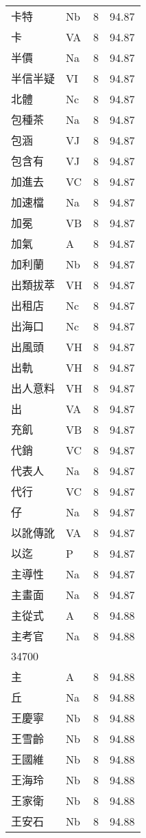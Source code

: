\documentclass[twocolumn]{book}
\begin{document}
\begin{supertabular}{llrr}
卡特 & Nb & 8 &  94.87\\
卡 & VA & 8 &  94.87\\
半價 & Na & 8 &  94.87\\
半信半疑 & VI & 8 &  94.87\\
北體 & Nc & 8 &  94.87\\
包種茶 & Na & 8 &  94.87\\
包涵 & VJ & 8 &  94.87\\
包含有 & VJ & 8 &  94.87\\
加進去 & VC & 8 &  94.87\\
加速檔 & Na & 8 &  94.87\\
加冕 & VB & 8 &  94.87\\
加氣 & A & 8 &  94.87\\
加利蘭 & Nb & 8 &  94.87\\
出類拔萃 & VH & 8 &  94.87\\
出租店 & Nc & 8 &  94.87\\
出海口 & Nc & 8 &  94.87\\
出風頭 & VH & 8 &  94.87\\
出軌 & VH & 8 &  94.87\\
出人意料 & VH & 8 &  94.87\\
出 & VA & 8 &  94.87\\
充飢 & VB & 8 &  94.87\\
代銷 & VC & 8 &  94.87\\
代表人 & Na & 8 &  94.87\\
代行 & VC & 8 &  94.87\\
仔 & Na & 8 &  94.87\\
以訛傳訛 & VA & 8 &  94.87\\
以迄 & P & 8 &  94.87\\
主導性 & Na & 8 &  94.87\\
主畫面 & Na & 8 &  94.87\\
主從式 & A & 8 &  94.88\\
主考官 & Na & 8 &  94.88\\
34700\\
主 & A & 8 &  94.88\\
丘 & Na & 8 &  94.88\\
王慶寧 & Nb & 8 &  94.88\\
王雪齡 & Nb & 8 &  94.88\\
王國維 & Nb & 8 &  94.88\\
王海玲 & Nb & 8 &  94.88\\
王家衛 & Nb & 8 &  94.88\\
王安石 & Nb & 8 &  94.88\\

\end{supertabular}
\end{document}
